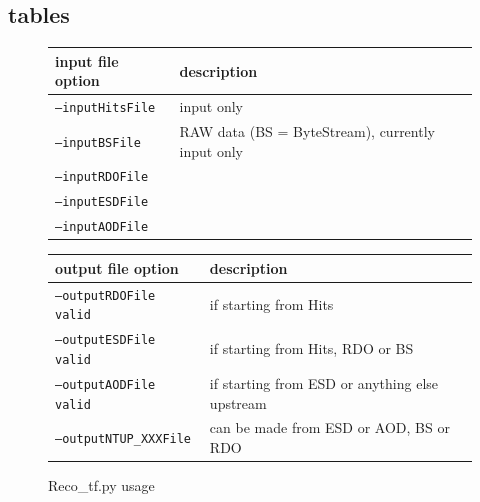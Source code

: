 \newpage

\subsection{tables}

\begin{figure}[h]
\begin{center}
\scriptsize
\begin{tabular}{p{3 cm}p{7 cm}}
\hline\hline
input file option&description\\
\hline
\texttt{--inputHitsFile}&input only\\
\texttt{--inputBSFile}&RAW data (BS = ByteStream), currently input only\\
\texttt{--inputRDOFile}&\\
\texttt{--inputESDFile}&\\
\texttt{--inputAODFile}&\\
\hline\hline
\end{tabular}
\end{center}
\mbox{}\newline
\begin{center}
\scriptsize
\begin{tabular}{p{3 cm}p{7 cm}}
\hline\hline
output file option&description\\
\hline
\texttt{--outputRDOFile	valid}&if starting from Hits\\
\texttt{--outputESDFile	valid}&if starting from Hits, RDO or BS\\
\texttt{--outputAODFile	valid}&if starting from ESD or anything else upstream\\
\texttt{--outputNTUP\_XXXFile}&can be made from ESD or AOD, BS or RDO\\
\hline\hline
\end{tabular}
\end{center}
\caption{Reco\_tf.py usage}
\end{figure}
